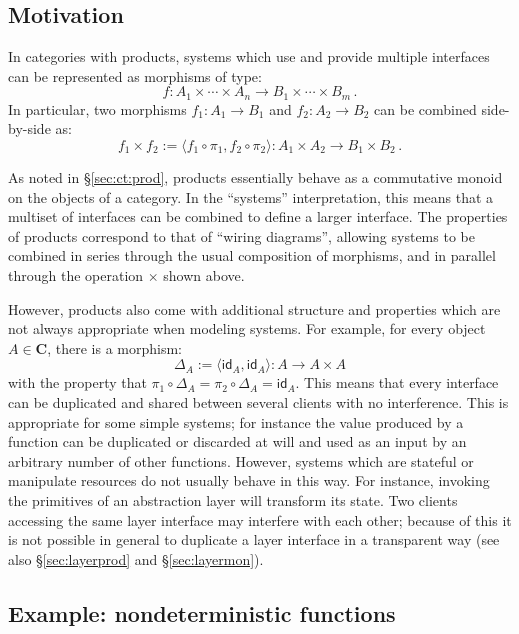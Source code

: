 \documentclass[11pt,oneside]{book}
\theoremstyle{definition}
\newcommand{\kw}[1]{\ensuremath{ \mathsf{#1} }}
\begin{document}
\subsection{Motivation} %

In categories with
products, systems
which use and provide multiple interfaces
can be represented
as morphisms of type:
\[
  f : A_1 \times \cdots \times A_n \rightarrow
      B_1 \times \cdots \times B_m
  \,.
\]
In particular,
two morphisms
$f_1 : A_1 \rightarrow B_1$ and
$f_2 : A_2 \rightarrow B_2$
can be combined side-by-side
as:
\[
  f_1 \times f_2 :=
  \langle f_1 \circ \pi_1, f_2 \circ \pi_2 \rangle :
  A_1 \times A_2 \rightarrow B_1 \times B_2
  \,.
\]

As noted in \S\ref{sec:ct:prod},
products essentially behave as a commutative monoid
on the objects of a category.
In the ``systems'' interpretation,
this means that a multiset of interfaces
can be combined to define a larger interface.
The properties of products
correspond to that of ``wiring diagrams'',
allowing systems to be combined in series
through the usual composition of morphisms,
and in parallel through the operation $\times$
shown above.

However,
products also come with additional structure and properties
which are not always appropriate
when modeling systems.
For example,
for every object $A \in \mathbf{C}$,
there is a morphism:
\[
  \Delta_A := \langle \kw{id}_A, \kw{id}_A \rangle :
    A \rightarrow A \times A
\]
with the property that
$\pi_1 \circ \Delta_A = \pi_2 \circ \Delta_A = \kw{id}_A$.
This means that every interface can be duplicated
and shared between several clients with no interference.
This is appropriate for some simple systems;
for instance the value produced by a function
can be duplicated or discarded at will
and used as an input by an arbitrary number of other functions.
However,
systems which are stateful or manipulate resources
do not usually behave in this way.
For instance,
invoking the primitives of an abstraction layer
will transform its state.
Two clients accessing the same layer interface
may interfere with each other;
because of this it is not possible in general
to duplicate a layer interface
in a transparent way
(see also \S\ref{sec:layerprod} and \S\ref{sec:layermon}).


\subsection{Example: nondeterministic functions} \label{sec:sup} %
\end{document}
